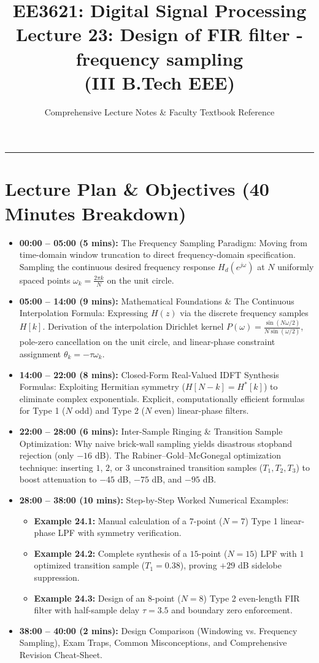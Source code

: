 \documentclass[11pt,a4paper]{article}
\title{\textbf{EE3621: Digital Signal Processing} \\ \Large Lecture 23: Design of FIR filter - frequency sampling \\ \large (III B.Tech EEE)}
\author{Comprehensive Lecture Notes \& Faculty Textbook Reference}
\date{}
\begin{document}
\maketitle

\noindent\rule{\textwidth}{0.5pt}

\section*{Lecture Plan \& Objectives (40 Minutes Breakdown)}
\begin{itemize}
    \item \textbf{00:00 -- 05:00 (5 mins):} The Frequency Sampling Paradigm: Moving from time-domain window truncation to direct frequency-domain specification. Sampling the continuous desired frequency response $H_d(e^{j\omega})$ at $N$ uniformly spaced points $\omega_k = \frac{2\pi k}{N}$ on the unit circle.
    \item \textbf{05:00 -- 14:00 (9 mins):} Mathematical Foundations \& The Continuous Interpolation Formula: Expressing $H(z)$ via the discrete frequency samples $H[k]$. Derivation of the interpolation Dirichlet kernel $P(\omega) = \frac{\sin(N\omega/2)}{N\sin(\omega/2)}$, pole-zero cancellation on the unit circle, and linear-phase constraint assignment $\theta_k = -\tau \omega_k$.
    \item \textbf{14:00 -- 22:00 (8 mins):} Closed-Form Real-Valued IDFT Synthesis Formulas: Exploiting Hermitian symmetry ($H[N-k] = H^*[k]$) to eliminate complex exponentials. Explicit, computationally efficient formulas for Type 1 ($N$ odd) and Type 2 ($N$ even) linear-phase filters.
    \item \textbf{22:00 -- 28:00 (6 mins):} Inter-Sample Ringing \& Transition Sample Optimization: Why naive brick-wall sampling yields disastrous stopband rejection (only $-16$ dB). The Rabiner--Gold--McGonegal optimization technique: inserting $1$, $2$, or $3$ unconstrained transition samples ($T_1, T_2, T_3$) to boost attenuation to $-45$ dB, $-75$ dB, and $-95$ dB.
    \item \textbf{28:00 -- 38:00 (10 mins):} Step-by-Step Worked Numerical Examples:
    \begin{itemize}
        \item \textbf{Example 24.1:} Manual calculation of a $7$-point ($N=7$) Type 1 linear-phase LPF with symmetry verification.
        \item \textbf{Example 24.2:} Complete synthesis of a $15$-point ($N=15$) LPF with $1$ optimized transition sample ($T_1 = 0.38$), proving $+29$ dB sidelobe suppression.
        \item \textbf{Example 24.3:} Design of an $8$-point ($N=8$) Type 2 even-length FIR filter with half-sample delay $\tau = 3.5$ and boundary zero enforcement.
    \end{itemize}
    \item \textbf{38:00 -- 40:00 (2 mins):} Design Comparison (Windowing vs. Frequency Sampling), Exam Traps, Common Misconceptions, and Comprehensive Revision Cheat-Sheet.
\end{itemize}
\end{document}
